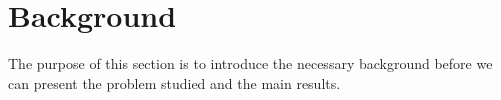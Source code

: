 \documentclass[12pt,draftcls,onecolumn]{IEEEtran}
\begin{document}
\begin{comment}
Our motivation stems from the fact that ALP with tractable number of constraints will result in a full dimeniosnality free ADP method. However, constraint reduction in ALP is an extra source of error (in addition to the error due to LFA), which has not been theoretically well understood.  The focus of this paper is to fill this gap in theory by deriving performance bounds for constraint reduction in ALP formulation.
The salient aspects of our contribution are listed below:
\begin{enumerate}
\item We define a generalized reduced linear programming (GRLP) which has a tractable number of constraints that are obtained as positive linear combinations of the original constraints. The GRLP amounts to linear function approximation of the dual variables, and RLP is a special case of GRLP.
\item We develop a novel analytical machinery to bound the prediction error $\norm{J^*-\hj}$ where $hj$ is the solution to GRLP.
\item We also bound the performance loss due to using the policy $\hu$ that is one-step greedy with respect to $\hj$ (Theorem~\ref{polthe}).
\item Our analysis is based on two novel $\max$-norm contraction operators and our results hold \emph{deterministically}, as opposed to the results on RLP \cite{SALP,CS}, where the guarantees have a probabilistic nature.
\item Our results on GRLP are the first to theoretically analyze the use of linear function approximation of Lagrangian (dual) variables underlying the constraints.
\item A numerical example in controlled queues is provided to illustrate the theory.
\end{enumerate}
A short and preliminary version of this paper without the theoretical analysis is available in \cite{aaaipaper}. The rest of the paper is organized as follows:
\end{comment}
\fi
\section{Background} %
The purpose of this section is to introduce the necessary background before we can present the problem studied and the main results.
\end{document}
